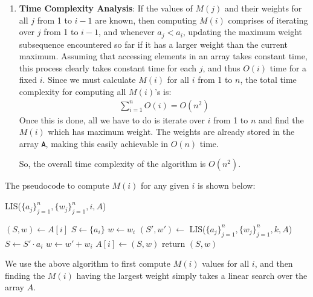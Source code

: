 \documentclass[11pt, fleqn]{article}
\begin{document}
\begin{enumerate}
\item \textbf{Time Complexity Analysis}: If the values of $M(j)$ and their weights for all $j$ from 1 to $i-1$ are known, then computing $M(i)$ comprises of iterating over $j$ from 1 to $i-1$, and whenever $a_j < a_i$, updating the maximum weight subsequence encountered so far if it has a larger weight than the current maximum. Assuming that accessing elements in an array takes constant time, this process clearly takes constant time for each $j$, and thus $O(i)$ time for a fixed $i$. Since we must calculate $M(i)$ for all $i$ from 1 to $n$, the total time complexity for computing all $M(i)$'s is:
\begin{align*}
    \sum_{i=1}^{n}O(i) = O(n^2)
\end{align*}
Once this is done, all we have to do is iterate over $i$ from 1 to $n$ and find the $M(i)$ which has maximum weight. The weights are already stored in the array \texttt{A}, making this easily achievable in $O(n)$ time.

\medskip

So, the overall time complexity of the algorithm is $O(n^2)$.

\end{enumerate}

The pseudocode to compute $M(i)$ for any given $i$ is shown below:

\begin{algorithm}[H]
    \SetAlgoLined
    \DontPrintSemicolon
    \caption{LIS($\{a_j\}_{j=1}^{n},\{w_j\}_{j=1}^{n},i,A$)}
     {
        $(S, w) \leftarrow A[i]$\;
    }{
        $S \leftarrow \{a_i\}$\;
        $w \leftarrow w_i$\;
         {
             {
                $(S', w') \leftarrow $ LIS($\{a_j\}_{j=1}^{n},\{w_j\}_{j=1}^{n},k,A$)\;
                 {
                    $S \leftarrow S'\cdot a_i$\;
                    $w \leftarrow w'+w_i$\;
                }
            }
        }
        $A[i] \leftarrow (S, w)$\;
    }
    return $(S, w)$\;
\end{algorithm}

We use the above algorithm to first compute $M(i)$ values for all $i$, and then finding the $M(i)$ having the largest weight simply takes a linear search over the array $A$.
\end{document}
